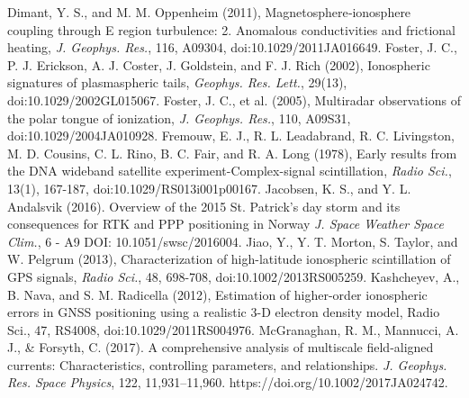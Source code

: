\documentclass[letterpaper,12pt]{article}
\begin{document}
\begin{thebibliography}{99}
\vspace{-1em}
Dimant, Y. S., and M. M. Oppenheim (2011), Magnetosphere‐ionosphere coupling through E region turbulence:
2. Anomalous conductivities and frictional heating, \emph{J. Geophys. Res.}, 116, A09304, doi:10.1029/2011JA016649.
\vspace{-1em}
Foster, J. C., P. J. Erickson, A. J. Coster, J. Goldstein, and F. J. Rich (2002), Ionospheric signatures of plasmaspheric tails, \emph{Geophys. Res. Lett.}, 29(13), doi:10.1029/2002GL015067.
\vspace{-1em}
Foster, J. C., et al. (2005), Multiradar observations of the polar tongue of ionization, \emph{J. Geophys. Res.}, 110, A09S31, doi:10.1029/2004JA010928.
\vspace{-1em}
Fremouw, E. J., R. L. Leadabrand, R. C. Livingston, M. D. Cousins, C. L. Rino, B. C. Fair, and R. A. Long (1978), Early results from the DNA wideband satellite experiment-Complex-signal scintillation, \emph{Radio Sci.}, 13(1), 167-187, doi:10.1029/RS013i001p00167.
\vspace{-1em}
Jacobsen, K. S., and Y. L. Andalsvik (2016). Overview of the 2015 St. Patrick’s day storm and its consequences for RTK and PPP positioning in Norway \emph{J. Space Weather Space Clim.}, 6 - A9 DOI: 10.1051/swsc/2016004.
\vspace{-1em}
Jiao, Y., Y. T. Morton, S. Taylor, and W. Pelgrum (2013), Characterization of high-latitude ionospheric scintillation of GPS signals, \textit{Radio Sci.}, 48, 698-708, doi:10.1002/2013RS005259.
\vspace{-1em}
Kashcheyev, A., B. Nava, and S. M. Radicella (2012), Estimation of higher-order ionospheric errors in GNSS
positioning using a realistic 3-D electron density model, Radio Sci., 47, RS4008, doi:10.1029/2011RS004976.
\vspace{-1em}
McGranaghan, R. M., Mannucci, A. J., \& Forsyth, C. (2017). A comprehensive analysis of multiscale field‐aligned currents: Characteristics, controlling parameters, and relationships. \emph{J. Geophys. Res. Space Physics}, 122, 11,931–11,960. https://doi.org/10.1002/2017JA024742.

\end{thebibliography}
\end{document}
